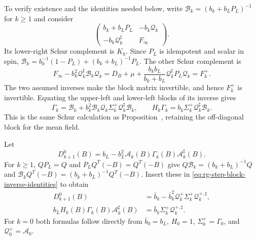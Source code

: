 To verify existence and the identities needed below,
write $\mathcal B_k=(b_k+b_LP_L)^{-1}$ for $k\ge1$
and consider
\[
 \begin{pmatrix}
 b_k+b_LP_L&-b_k\mathcal Q_k\\
 -b_k\mathcal Q_k^\sharp&F_\infty
 \end{pmatrix}.
\]
Its lower-right Schur complement is $K_k$.
Since $P_L$ is idempotent and scalar in spin,
$\mathcal B_k=b_k^{-1}(1-P_L)+(b_k+b_L)^{-1}P_L$.
The other Schur complement is
\[
 F_\infty-b_k^2\mathcal Q_k^\sharp\mathcal B_k\mathcal Q_k
    =D_B+\mu+\frac{b_kb_L}{b_k+b_L}
                                  \mathcal Q_k^\sharp P_L\mathcal Q_k
    =F_k^+.
\]
The two assumed inverses make the block matrix
invertible, and hence $F_k^+$ is invertible.
Equating the upper-left and lower-left blocks of
its inverse gives
\begin{equation}\label{eq:rg-step-block-inverse-identities}
 \Gamma_k=\mathcal B_k+
       b_k^2\mathcal B_k\mathcal Q_k\Sigma_k^+
                                     \mathcal Q_k^\sharp\mathcal B_k,
 \qquad
 H_k\Gamma_k=b_k\Sigma_k^+\mathcal Q_k^\sharp\mathcal B_k.
\end{equation}
This is the same Schur calculation as
Proposition~, retaining
the off-diagonal block for the mean field.

Let
\begin{equation}\label{eq:rg-step-unscaled-coarse}
 D_{k+1}^0(B)=b_L-
                       b_L^2\mathcal A_k(B)\Gamma_k(B)\mathcal A_k^\sharp(B).
\end{equation}
For $k\ge1$, $QP_L=Q$ and $P_LQ^T(-B)=Q^T(-B)$
give
$Q\mathcal B_k=(b_k+b_L)^{-1}Q$ and
$\mathcal B_kQ^T(-B)=(b_k+b_L)^{-1}Q^T(-B)$.
Insert these in \eqref{eq:rg-step-block-inverse-identities}
to obtain
\begin{equation}\label{eq:rg-step-compressed-identities}
 \begin{split}
 D_{k+1}^0(B)
       &=\bar b_k-\bar b_k^2
                            \mathcal Q_k^+\Sigma_k^+\mathcal Q_k^{+,\sharp},\\
 b_LH_k(B)\Gamma_k(B)\mathcal A_k^\sharp(B)
       &=\bar b_k\Sigma_k^+\mathcal Q_k^{+,\sharp}.
 \end{split}
\end{equation}
For $k=0$ both formulas follow directly from
$\bar b_0=b_L$, $H_0=1$,
$\Sigma_0^+=\Gamma_0$, and
$\mathcal Q_0^+=\mathcal A_0$.

